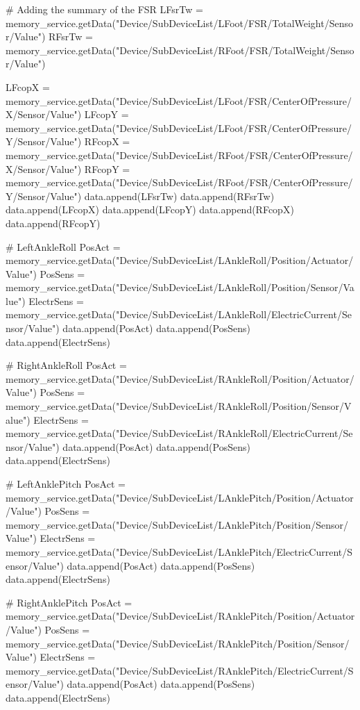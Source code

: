 \begin{python} [caption={Pythonprogramm für Messaufnahmen}, label=Messungscode]
				# Adding the summary of the FSR
				LFsrTw = memory_service.getData("Device/SubDeviceList/LFoot/FSR/TotalWeight/Sensor/Value")
				RFsrTw = memory_service.getData("Device/SubDeviceList/RFoot/FSR/TotalWeight/Sensor/Value")
				
				LFcopX = memory_service.getData("Device/SubDeviceList/LFoot/FSR/CenterOfPressure/X/Sensor/Value")
				LFcopY = memory_service.getData("Device/SubDeviceList/LFoot/FSR/CenterOfPressure/Y/Sensor/Value")
				RFcopX = memory_service.getData("Device/SubDeviceList/RFoot/FSR/CenterOfPressure/X/Sensor/Value")
				RFcopY = memory_service.getData("Device/SubDeviceList/RFoot/FSR/CenterOfPressure/Y/Sensor/Value")
				data.append(LFsrTw)
				data.append(RFsrTw)
				data.append(LFcopX)
				data.append(LFcopY)
				data.append(RFcopX)
				data.append(RFcopY)
				
				# LeftAnkleRoll
				PosAct = memory_service.getData("Device/SubDeviceList/LAnkleRoll/Position/Actuator/Value")
				PosSens = memory_service.getData("Device/SubDeviceList/LAnkleRoll/Position/Sensor/Value")
				ElectrSens = memory_service.getData("Device/SubDeviceList/LAnkleRoll/ElectricCurrent/Sensor/Value")
				data.append(PosAct)
				data.append(PosSens)
				data.append(ElectrSens)
				
				# RightAnkleRoll
				PosAct = memory_service.getData("Device/SubDeviceList/RAnkleRoll/Position/Actuator/Value")
				PosSens = memory_service.getData("Device/SubDeviceList/RAnkleRoll/Position/Sensor/Value")
				ElectrSens = memory_service.getData("Device/SubDeviceList/RAnkleRoll/ElectricCurrent/Sensor/Value")
				data.append(PosAct)
				data.append(PosSens)
				data.append(ElectrSens)
				
				# LeftAnklePitch
				PosAct = memory_service.getData("Device/SubDeviceList/LAnklePitch/Position/Actuator/Value")
				PosSens = memory_service.getData("Device/SubDeviceList/LAnklePitch/Position/Sensor/Value")
				ElectrSens = memory_service.getData("Device/SubDeviceList/LAnklePitch/ElectricCurrent/Sensor/Value")
				data.append(PosAct)
				data.append(PosSens)
				data.append(ElectrSens)
				
				# RightAnklePitch
				PosAct = memory_service.getData("Device/SubDeviceList/RAnklePitch/Position/Actuator/Value")
				PosSens = memory_service.getData("Device/SubDeviceList/RAnklePitch/Position/Sensor/Value")
				ElectrSens = memory_service.getData("Device/SubDeviceList/RAnklePitch/ElectricCurrent/Sensor/Value")
				data.append(PosAct)
				data.append(PosSens)
				data.append(ElectrSens)
				

\end{python}
